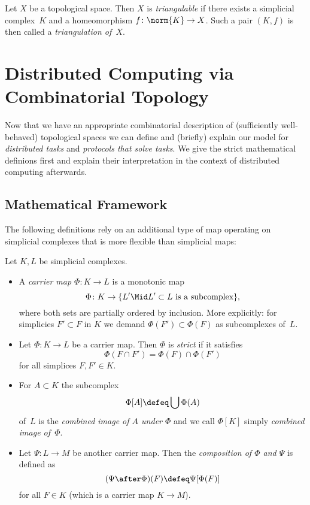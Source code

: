 \begin{thDef}[triangulation]
    Let $X$ be a topological space. Then $X$ is \emph{triangulable} if
    there exists a simplicial complex~$K$ and a homeomorphism
    $f\colon\norm{K}\to X$. Such a pair $(K,f)$ is then called
    a \emph{triangulation of~$X$}.
\end{thDef}


\section{Distributed Computing via Combinatorial Topology}
Now that we have an appropriate combinatorial description of (sufficiently
well-behaved) topological spaces we can define and (briefly) explain our
model for \emph{distributed tasks} and \emph{protocols that solve tasks}.
We give the strict mathematical definions first and explain their interpretation
in the context of distributed computing afterwards.

\subsection{Mathematical Framework}
The following definitions rely on an additional type of map operating on
simplicial complexes that is more flexible than simplicial maps:

\begin{thDef}
    Let $K,L$ be simplicial complexes. 
    \begin{itemize}
        \item
            A \emph{carrier map $\Phi\colon K\to L$} is a monotonic map
            \[ \Phi\colon K \to \{ L' \Mid L'\subset L \text{ is a subcomplex} \}  , \]
            where both sets are partially ordered by inclusion. More explicitly:
            for simplicies $F' \subset F$ in $K$ we demand $\Phi(F') \subset
            \Phi(F)$ as subcomplexes of~$L$.
            
        \item
            Let $\Phi\colon K\to L$ be a carrier map. Then $\Phi$ is
            \emph{strict} if it satisfies
            \[ \Phi(F\cap F') = \Phi(F) \cap \Phi(F') \]
            for all simplices $F,F'\in K$.
            
        \item
            For $A\subset K$ the subcomplex
            \[ \Phi[A] \defeq \bigcup \Phi(A) \]
            of~$L$ is the \emph{combined image of $A$ under $\Phi$}
            and we call $\Phi[K]$ simply \emph{combined image of~$\Phi$}.
            
        \item
            Let $\Psi\colon L\to M$ be another carrier map. Then the
            \emph{composition of $\Phi$ and $\Psi$} is defined as
            \[ (\Psi\after\Phi)(F) \defeq \Psi[\Phi(F)] \]
            for all $F\in K$ (which is a carrier map $K\to M$).
    \end{itemize}
\end{thDef}

